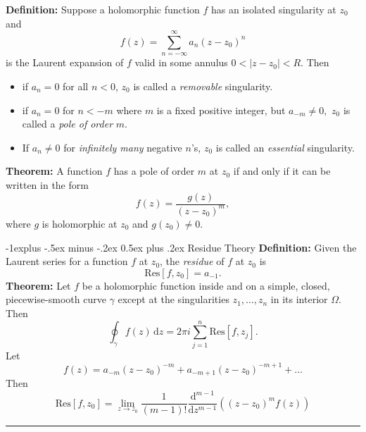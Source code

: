 \documentclass[10pt,landscape]{article}
\makeatletter
\renewcommand{\subsection}{\@startsection{subsection}{2}{0mm}%
                                {-1explus -.5ex minus -.2ex}%
                                {0.5ex plus .2ex}%
                                {\normalfont\normalsize\bfseries}}
\makeatother
\begin{document}
\begin{multicols}{3}
\textbf{Definition:} Suppose a holomorphic function $f$ has an isolated singularity
at $z_0$ and $$f(z)= \sum_{n = -\infty}^{\infty} a_n (z - z_0)^n$$ is the Laurent expansion of $f$ valid in some annulus $0 < |z - z_0| < R.$ Then
\begin{itemize}
\item if $a_n = 0$ for all $n < 0$, $z_0$ is called a \textit{removable} singularity.
\item if $a_n = 0$ for $n < -m$ where $m$ is a fixed positive integer, but $a_{-m} \neq 0,$ $z_0$ is called a \textit{pole of order} $m$.
\item If $a_n \neq 0$ for \textit{infinitely many} negative $n$'s, $z_0$ is called an \textit{essential}
singularity.
\end{itemize}

\textbf{Theorem:} A function $f$ has a pole of order $m$ at $z_0$ if and only if it can be
written in the form
$$f(z) = \frac{g(z)}{(z - z_0)^m}
,$$
where $g$ is holomorphic at $z_0$ and $g(z_0) \neq 0$.

\subsection{Residue Theory}
\textbf{Definition:} Given the Laurent series for a function $f$ at $z_0$, the \textit{residue} of $f$ at $z_0$ is
$$\text{Res} [f, z_0] = a_{-1}.$$
\textbf{Theorem:} Let $f$ be a holomorphic function inside and on a simple, closed,
piecewise-smooth curve $\gamma$ except at the singularities $z_1, \ldots , z_n$ in its interior
$\Omega$. Then $$\oint_{\gamma} f(z) \, \text{d}z = 2 \pi i \sum_{j=1}^n \text{Res}[f,z_j].$$
Let $$f(z) = a_{-m}(z - z_0)^{-m} + a_{-m+1}(z - z_0)^{-m+1}+ \ldots$$ Then $$\text{Res} [f, z_0] = \lim_{z \rightarrow z_0} \frac{1}{(m-1)!}\frac{\text{d}^{m-1}}{\text{d}z^{m-1}}\left( (z - z_0)^m f(z) \right)$$
\rule{0.3\linewidth}{0.25pt}
\scriptsize


\end{multicols}
\end{document}
